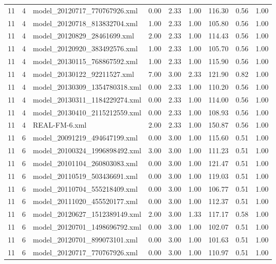 \begin{table}[ht]
\begin{tabular}{rrlrrrrrr}
   11 &   4 & model\_20120717\_770767926.xml & 0.00 & 2.33 & 1.00 & 116.30 & 0.56 & 1.00 \\ 
   11 &   4 & model\_20120718\_813832704.xml & 1.00 & 2.33 & 1.00 & 105.80 & 0.56 & 1.00 \\ 
   11 &   4 & model\_20120829\_28461699.xml & 2.00 & 2.33 & 1.00 & 114.43 & 0.56 & 1.00 \\ 
   11 &   4 & model\_20120920\_383492576.xml & 1.00 & 2.33 & 1.00 & 105.70 & 0.56 & 1.00 \\ 
   11 &   4 & model\_20130115\_768867592.xml & 1.00 & 2.33 & 1.00 & 115.90 & 0.56 & 1.00 \\ 
   11 &   4 & model\_20130122\_92211527.xml & 7.00 & 3.00 & 2.33 & 121.90 & 0.82 & 1.00 \\ 
   11 &   4 & model\_20130309\_1354780318.xml & 0.00 & 2.33 & 1.00 & 110.20 & 0.56 & 1.00 \\ 
   11 &   4 & model\_20130311\_1184229274.xml & 0.00 & 2.33 & 1.00 & 114.00 & 0.56 & 1.00 \\ 
   11 &   4 & model\_20130410\_2115212559.xml & 0.00 & 2.33 & 1.00 & 108.93 & 0.56 & 1.00 \\ 
   11 &   4 & REAL-FM-6.xml & 2.00 & 2.33 & 1.00 & 150.87 & 0.56 & 1.00 \\ 
   11 &   6 & model\_20091219\_494647199.xml & 0.00 & 3.00 & 1.00 & 115.60 & 0.51 & 1.00 \\ 
   11 &   6 & model\_20100324\_1996898492.xml & 3.00 & 3.00 & 1.00 & 111.23 & 0.51 & 1.00 \\ 
   11 &   6 & model\_20101104\_260803083.xml & 0.00 & 3.00 & 1.00 & 121.47 & 0.51 & 1.00 \\ 
   11 &   6 & model\_20110519\_503436691.xml & 0.00 & 3.00 & 1.00 & 119.03 & 0.51 & 1.00 \\ 
   11 &   6 & model\_20110704\_555218409.xml & 0.00 & 3.00 & 1.00 & 106.77 & 0.51 & 1.00 \\ 
   11 &   6 & model\_20111020\_455520177.xml & 0.00 & 3.00 & 1.00 & 112.37 & 0.51 & 1.00 \\ 
   11 &   6 & model\_20120627\_1512389149.xml & 2.00 & 3.00 & 1.33 & 117.17 & 0.58 & 1.00 \\ 
   11 &   6 & model\_20120701\_1498696792.xml & 0.00 & 3.00 & 1.00 & 102.07 & 0.51 & 1.00 \\ 
   11 &   6 & model\_20120701\_899073101.xml & 0.00 & 3.00 & 1.00 & 101.63 & 0.51 & 1.00 \\ 
   11 &   6 & model\_20120717\_770767926.xml & 0.00 & 3.00 & 1.00 & 110.97 & 0.51 & 1.00 \\ 

\end{tabular}
\end{table}
